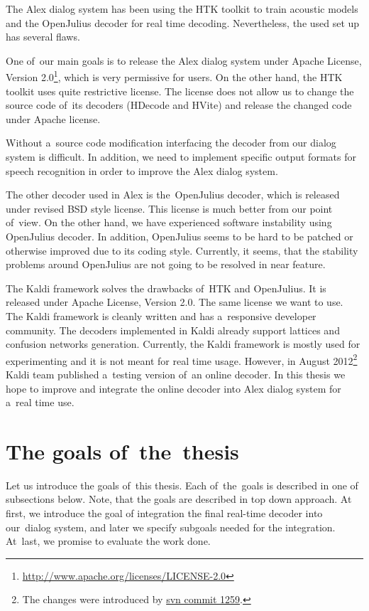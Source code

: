 The Alex dialog system has been using the HTK toolkit\cite{young94htk} to train acoustic models and the OpenJulius\cite{lee2009julius} decoder for real time decoding. Nevertheless, the used set up has several flaws.

One of~our main goals is to release the Alex dialog system under Apache License, Version 2.0\footnote{\url{http://www.apache.org/licenses/LICENSE-2.0}}, which is very permissive for users. On the other hand, the HTK toolkit uses quite restrictive license. The license does not allow us to change the source code of~its decoders (HDecode and HVite) and release the changed code under Apache license. 

Without a~source code modification interfacing the decoder from our dialog system is difficult. In addition, we need to implement specific output formats for speech recognition in order to improve the Alex dialog system.

The other decoder used in Alex is the~OpenJulius decoder, which is released under revised BSD style license. This license is much better from our point of~view. On the other hand, we have experienced software instability using OpenJulius decoder. In addition, OpenJulius seems to be hard to be patched or otherwise improved due to its coding style. Currently, it seems, that the stability problems around OpenJulius are not going to be resolved in near feature.

The Kaldi\cite{povey2011kaldi} framework solves the drawbacks of~HTK and OpenJulius. It is released under Apache License, Version 2.0. The same license we want to use. The Kaldi framework is cleanly written and has a~responsive developer community. The decoders implemented in Kaldi already support lattices and confusion networks generation. Currently, the Kaldi framework is mostly used for experimenting and it is not meant for real time usage. However, in August 2012\footnote{The changes were introduced by \href{https://sourceforge.net/p/kaldi/code/1259/}{svn commit 1259}.} Kaldi team published a~testing version of~an online decoder. In this thesis we hope to improve and integrate the online decoder into Alex dialog system for a~real time use.


\section{The goals of~the~thesis} 
\label{sec:goals}
Let us introduce the goals of~this thesis. Each of~the~goals is described in one of subsections below. Note, that the goals are described in top down approach.
At first, we introduce the goal of integration the final real-time decoder into our~dialog system, and later we specify subgoals needed for the integration.
At~last, we promise to evaluate the work done.

